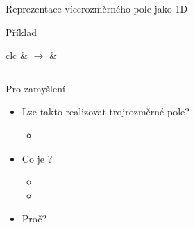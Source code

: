 \begin{frame}{Reprezentace vícerozměrného pole jako 1D}
\begin{block}{Příklad}
\begin{center}
\begin{tabular}{clc}
& $\rightarrow$ &

\tiny
\setlength{\tabcolsep}{0.5pt}
\begin{tabular}{|c|c|c|c|c|c|c|c|} \hline
\cellcolor{green} \code{[0][0]} & \cellcolor{green} \code{[0][1]} & \cellcolor{green} \code{[0][2]} & \cellcolor{green} \code{[0][3]} &
\cellcolor{cyan} \code{[1][0]} & \cellcolor{cyan} \code{[1][1]} & \cellcolor{cyan} \code{[1][2]} & \cellcolor{cyan} \code{[1][3]} \\ \hline
\end{tabular}

\end{tabular} \vspace{0.5em}
\end{center}
\end{block}

\end{frame}

\begin{frame}{Pro zamyšlení}

  \begin{itemize}
    \item Lze takto realizovat trojrozměrné pole?
    \begin{itemize}
      \item {}
    \end{itemize}

    \pause

    \item Co je ?
    \begin{itemize}
      \item {}
      \item {}
    \end{itemize}

    \pause

    \item Proč?
  \end{itemize}

\end{frame}

